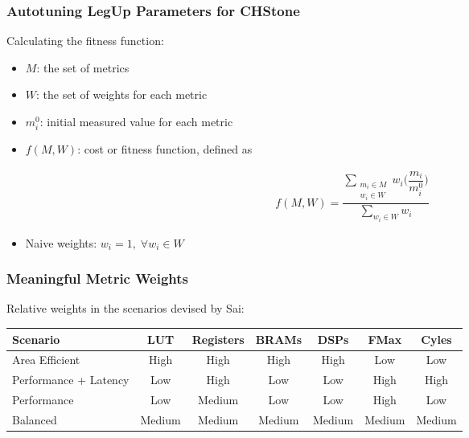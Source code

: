 \documentclass[10pt, compress, aspectratio=169, xcolor=table]{beamer}
\begin{document}
\begin{frame}
    \frametitle{Autotuning LegUp Parameters for CHStone}
    Calculating the \alert{fitness function}:

    \begin{itemize}
        \item $M$: the set of \alert{metrics}
        \item $W$: the set of \alert{weights for each metric}
        \item $m_{i}^{0}$: \alert{initial measured value} for each metric
        \item $f(M,W)$: \alert{cost} or \alert{fitness function}, defined as
    \end{itemize}
    \begin{align*}
        f(M, W) = \dfrac{\sum\limits_{\substack{m_i \in M \\ w_i \in W}}{w_i\Big(\dfrac{m_i}{m_{i}^{0}}\Big)}}{\sum\limits_{w_i \in W}{w_i}}
    \end{align*}
    \begin{itemize}
        \item \alert{Naive weights}: $w_i = 1, \; \forall w_i \in W$
    \end{itemize}
\end{frame}

\begin{frame}[fragile]
    \frametitle{Meaningful Metric Weights}

    Relative weights in the \alert{scenarios devised by Sai}:

    \begin{table}[]
        \centering
        \begin{tabular}{@{}lcccccc@{}}
            \toprule
            Scenario & LUT & Registers & BRAMs & DSPs & FMax & Cyles \\ \midrule
            Area Efficient & \cellcolor[HTML]{32CB00} High & \cellcolor[HTML]{32CB00} High & \cellcolor[HTML]{32CB00} High & \cellcolor[HTML]{32CB00} High & \cellcolor[HTML]{FD6864} Low & \cellcolor[HTML]{FD6864} Low \\
            Performance + Latency & \cellcolor[HTML]{FD6864} Low & \cellcolor[HTML]{32CB00} High & \cellcolor[HTML]{FD6864} Low & \cellcolor[HTML]{FD6864} Low & \cellcolor[HTML]{32CB00} High & \cellcolor[HTML]{32CB00} High \\
            Performance & \cellcolor[HTML]{FD6864} Low & \cellcolor[HTML]{FFCC67} Medium & \cellcolor[HTML]{FD6864} Low & \cellcolor[HTML]{FD6864} Low & \cellcolor[HTML]{32CB00} High & \cellcolor[HTML]{FD6864} Low \\
            Balanced & \cellcolor[HTML]{FFCC67} Medium & \cellcolor[HTML]{FFCC67} Medium & \cellcolor[HTML]{FFCC67} Medium & \cellcolor[HTML]{FFCC67} Medium & \cellcolor[HTML]{FFCC67} Medium & \cellcolor[HTML]{FFCC67} Medium \\ \bottomrule
        \end{tabular}
    \end{table}
\end{frame}
\end{document}
